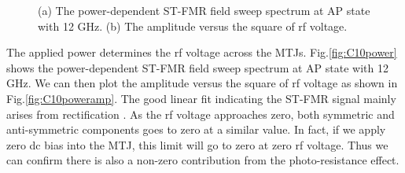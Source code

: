 \begin{figure}[!ht]
\centering
{}
\caption{(a) The power-dependent ST-FMR field sweep spectrum at AP state with 12 GHz. (b) The amplitude versus the square of rf voltage.}
\end{figure}

The applied power determines the rf voltage across the MTJs. Fig.\ref{fig:C10power} shows the power-dependent ST-FMR field sweep spectrum at AP state with 12 GHz. We can then plot the amplitude versus the square of rf voltage as shown in Fig.\ref{fig:C10poweramp}. The good linear fit indicating the ST-FMR signal mainly arises from rectification \cite{photovoltage1}. As the rf voltage approaches zero, both symmetric and anti-symmetric components goes to zero at a similar value. In fact, if we apply zero dc bias into the MTJ, this limit will go to zero at zero rf voltage. Thus we can confirm there is also a non-zero contribution from the photo-resistance effect\cite{photovoltage2}.


